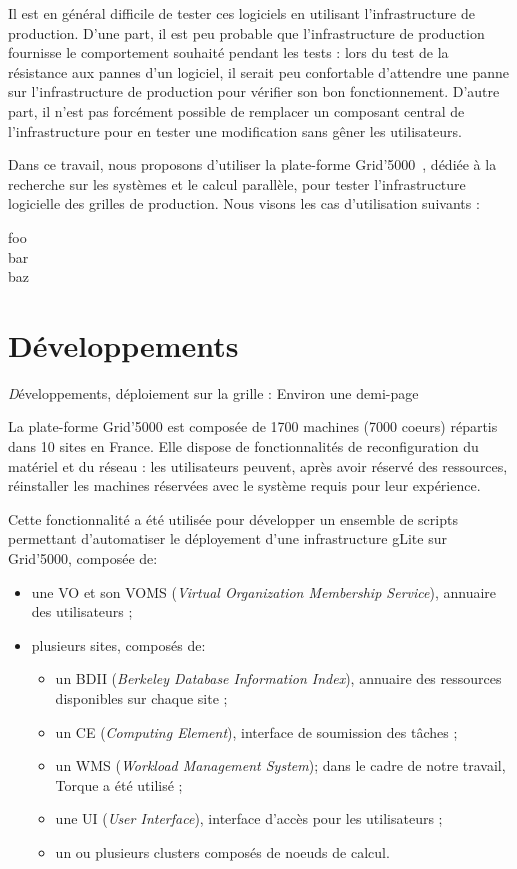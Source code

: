 \documentclass[a4paper,11pt]{article}
\newcommand{\todo}[1]{{\color{red}\textsl #1}}
\begin{document}
Il est en général difficile de tester ces logiciels en utilisant
l'infrastructure de production. D'une part, il est peu probable que
l'infrastructure de production fournisse le comportement souhaité pendant les
tests : lors du test de la résistance aux pannes d'un logiciel, il serait peu
confortable d'attendre une panne sur l'infrastructure de production pour
vérifier son bon fonctionnement. D'autre part, il n'est pas forcément possible
de remplacer un composant central de l'infrastructure pour en tester une
modification sans gêner les utilisateurs.

Dans ce travail, nous proposons d'utiliser la plate-forme
Grid'5000~\cite{grid5000,grid5000web}, dédiée à la recherche sur les systèmes
et le calcul parallèle, pour tester l'infrastructure logicielle des grilles de
production.  Nous visons les cas d'utilisation suivants :
\begin{description}
\item[foo]
\item[bar]
\item[baz]
\end{description}

\section{Développements}
\todo{Développements, déploiement sur la grille : Environ une demi-page}

La plate-forme Grid'5000 est composée de 1700 machines (7000 coeurs) répartis
dans 10 sites en France. Elle dispose de fonctionnalités de reconfiguration du
matériel et du réseau : les utilisateurs peuvent, après avoir réservé des
ressources, réinstaller les machines réservées avec le système requis pour leur
expérience.

Cette fonctionnalité a été utilisée pour développer un ensemble de scripts
permettant d'automatiser le déployement d'une infrastructure gLite sur
Grid'5000, composée de:
\begin{itemize}
\item une VO et son VOMS (\textsl{Virtual Organization Membership Service}), annuaire des utilisateurs ;
\item plusieurs sites, composés de:
\begin{itemize}
	\item un BDII (\textsl{Berkeley Database Information Index}), annuaire des ressources disponibles sur chaque site ;
	\item un CE (\textsl{Computing Element}), interface de soumission des tâches ;
	\item un WMS (\textsl{Workload Management System}); dans le cadre de notre travail, Torque a été utilisé ;
	\item une UI (\textsl{User Interface}), interface d'accès pour les utilisateurs ;
	\item un ou plusieurs clusters composés de noeuds de calcul.
\end{itemize}
\end{itemize}
\end{document}
